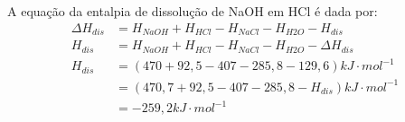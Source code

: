             \indent A equação da entalpia de dissolução de NaOH em HCl é dada por:\\
            \begin{equation}
                \begin{split}
                    \Delta{H_{dis}} &= H_{NaOH} + H_{HCl} - H_{NaCl} - H_{H2O} - H_{dis} \\
                    H_{dis} &= H_{NaOH} + H_{HCl} - H_{NaCl} - H_{H2O} - \Delta{H_{dis}} \\
                    H_{dis} &= (470 + 92,5 - 407 - 285,8 - 129,6)kJ \cdot mol^{-1} \\
                    &= (470,7 + 92,5 - 407 - 285,8 - H_{dis})kJ \cdot mol^{-1} \\
                    &= - 259,2 kJ \cdot mol^{-1}
                \end{split}
			\end{equation}

